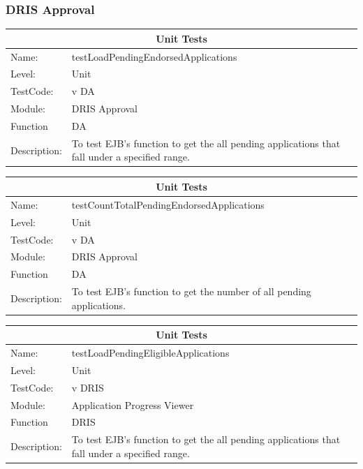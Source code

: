 \documentclass[12pt]{article}
\begin{document}
\subsubsection{DRIS Approval}

\begin{center}
\begin{tabular}{|l|p{12cm}|}
\hline
\multicolumn{2}{|c|}{\bf Unit Tests} \\
\hline
 Name: & testLoadPendingEndorsedApplications  \\
\hline
Level: & Unit \\
\hline
TestCode: & v DA \\
\hline
Module:& DRIS Approval \\
\hline
Function & DA \\
\hline
Description: & To test EJB's function to get the all pending applications that fall under a specified range. \\
\hline
\end{tabular}
\end{center}

\begin{center}
\begin{tabular}{|l|p{12cm}|}
\hline
\multicolumn{2}{|c|}{\bf Unit Tests} \\
\hline
 Name: & testCountTotalPendingEndorsedApplications  \\
\hline
Level: & Unit \\
\hline
TestCode: & v DA \\
\hline
Module:& DRIS Approval \\
\hline
Function & DA \\
\hline
Description: & To test EJB's function to get the number of all pending applications. \\
\hline
\end{tabular}
\end{center}

\begin{center}
\begin{tabular}{|l|p{12cm}|}
\hline
\multicolumn{2}{|c|}{\bf Unit Tests} \\
\hline
 Name: & testLoadPendingEligibleApplications  \\
\hline
Level: & Unit \\
\hline
TestCode: & v DRIS \\
\hline
Module:& Application Progress Viewer \\
\hline
Function & DRIS \\
\hline
Description: & To test EJB's function to get the all pending applications that fall under a specified range. \\
\hline
\end{tabular}
\end{center}
\end{document}
